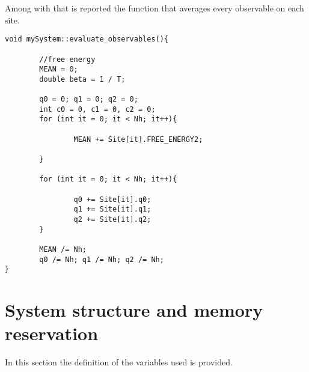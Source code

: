 Among with that is reported the function that averages every observable on each site.

\begin{verbatim}
void mySystem::evaluate_observables(){

        //free energy
        MEAN = 0;
        double beta = 1 / T;
        
        q0 = 0; q1 = 0; q2 = 0;
        int c0 = 0, c1 = 0, c2 = 0;
        for (int it = 0; it < Nh; it++){

                MEAN += Site[it].FREE_ENERGY2;

        }
        
        for (int it = 0; it < Nh; it++){

                q0 += Site[it].q0;
                q1 += Site[it].q1;
                q2 += Site[it].q2;
        }
        
        MEAN /= Nh;
        q0 /= Nh; q1 /= Nh; q2 /= Nh;
}
\end{verbatim}
\section{System structure and memory reservation}
In this section the definition of the variables used is provided.

